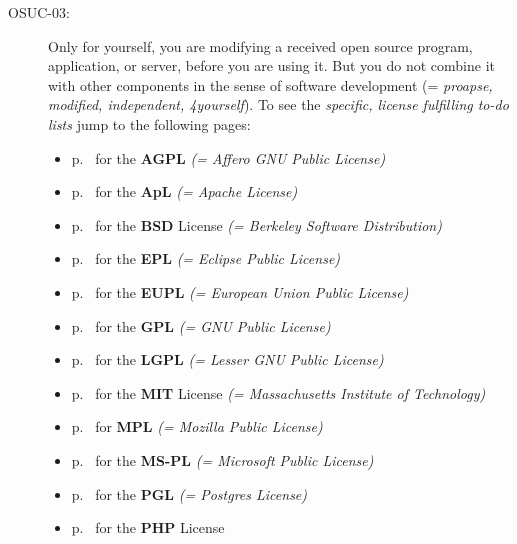 \begin{description}
\item[OSUC-03:]\label{OSUC-03-DEF} Only for yourself, you are modifying a
received open source program, application, or server, before you are using it.
But you do not combine it with other components in the sense of software
development (= \textit{proapse, modified, independent, 4yourself}).
To see the \textit{specific, license fulfilling to-do lists} jump to the
following pages:
   \begin{itemize}
    \item p.\ \pageref{OSUC-03-AGPL} for the \textbf{AGPL}
      \textit{(= Affero GNU Public License)} 
    \item p.\ \pageref{OSUC-03-Apache20} for the \textbf{ApL}
      \textit{(= Apache License)}
    \item p.\ \pageref{OSUC-03-BSD} for the \textbf{BSD} License
      \textit{(= Berkeley Software Distribution)}
    \item p.\ \pageref{OSUC-03-EPL} for the \textbf{EPL}
      \textit{(= Eclipse Public License)}     
    \item p.\ \pageref{OSUC-03-EUPL} for the \textbf{EUPL}
      \textit{(= European Union Public License)} 
    \item p.\ \pageref{OSUC-03-GPL} for the \textbf{GPL}
       \textit{(= GNU Public License)} 
    \item p.\ \pageref{OSUC-03-LGPL} for the \textbf{LGPL}
      \textit{(= Lesser GNU Public License)}           
    \item p.\ \pageref{OSUC-03-MIT} for the \textbf{MIT} License
       \textit{(= Massachusetts Institute of Technology)} 
    \item p.\ \pageref{OSUC-03-MPL} for \textbf{MPL}
      \textit{(= Mozilla Public License)}     
    \item p.\ \pageref{OSUC-03-MS-PL} for the \textbf{MS-PL}
      \textit{(= Microsoft Public License)} 
    \item p.\ \pageref{OSUC-03-PGL} for the \textbf{PGL}
      \textit{(= Postgres License)} 
    \item p.\ \pageref{OSUC-03-PHP} for the \textbf{PHP} License 
  \end{itemize}


\end{description}
